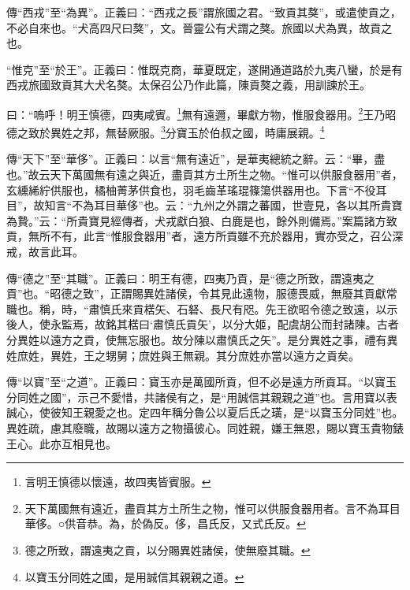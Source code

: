 {\noindent\zhuan{}\fzbyks 傳“西戎”至“為異”。正義曰：“西戎之長”謂旅國之君。“致貢其獒”，或遣使貢之，不必自來也。“犬高四尺曰獒”，文。晉靈公有犬謂之獒。旅國以犬為異，故貢之也。 \par}

{\noindent\shu{}\fzkt “惟克”至“於王”。正義曰：惟既克商，華夏既定，遂開通道路於九夷八蠻，於是有西戎旅國致貢其大犬名獒。太保召公乃作此篇，陳貢獒之義，用訓諫於王。 \par}

曰：“嗚呼！明王慎德，四夷咸賓。\footnote{言明王慎德以懷遠，故四夷皆賓服。}無有遠邇，畢獻方物，惟服食器用。\footnote{天下萬國無有遠近，盡貢其方土所生之物，惟可以供服食器用者。言不為耳目華侈。○供音恭。為，於偽反。侈，昌氏反，又式氏反。}王乃昭德之致於異姓之邦，無替厥服。\footnote{德之所致，謂遠夷之貢，以分賜異姓諸侯，使無廢其職。}分寶玉於伯叔之國，時庸展親。\footnote{以寶玉分同姓之國，是用誠信其親親之道。}


{\noindent\zhuan{}\fzbyks 傳“天下”至“華侈”。正義曰：以言“無有遠近”，是華夷總統之辭。云：“畢，盡也。”故云天下萬國無有遠之與近，盡貢其方土所生之物。“惟可以供服食器用”者，玄纁絺紵供服也，橘柚菁茅供食也，羽毛齒革瑤琨篠簜供器用也。下言“不役耳目”，故知言“不為耳目華侈”也。云：“九州之外謂之蕃國，世壹見，各以其所貴寶為贄。”云：“所貴寶見經傳者，犬戎獻白狼、白鹿是也，餘外則備焉。”案篇諸方致貢，無所不有，此言“惟服食器用”者，遠方所貢雖不充於器用，實亦受之，召公深戒，故言此耳。 \par}

{\noindent\zhuan{}\fzbyks 傳“德之”至“其職”。正義曰：明王有德，四夷乃貢，是“德之所致，謂遠夷之貢”也。“昭德之致”，正謂賜異姓諸侯，令其見此遠物，服德畏威，無廢其貢獻常職也。稱，時，“肅慎氏來貢楛矢、石砮、長尺有咫。先王欲昭令德之致遠，以示後人，使永監焉，故銘其楛曰‘肅慎氏貢矢’，以分大姬，配虞胡公而封諸陳。古者分異姓以遠方之貢，使無忘服也。故分陳以肅慎氏之矢”。是分異姓之事，禮有異姓庶姓，異姓，王之甥舅；庶姓與王無親。其分庶姓亦當以遠方之貢矣。 \par}

{\noindent\zhuan{}\fzbyks 傳“以寶”至“之道”。正義曰：寶玉亦是萬國所貢，但不必是遠方所貢耳。“以寶玉分同姓之國”，示己不愛惜，共諸侯有之，是“用誠信其親親之道”也。言用寶以表誠心，使彼知王親愛之也。定四年稱分魯公以夏后氏之璜，是“以寶玉分同姓”也。異姓疏，慮其廢職，故賜以遠方之物攝彼心。同姓親，嫌王無恩，賜以寶玉貴物錶王心。此亦互相見也。 \par}

